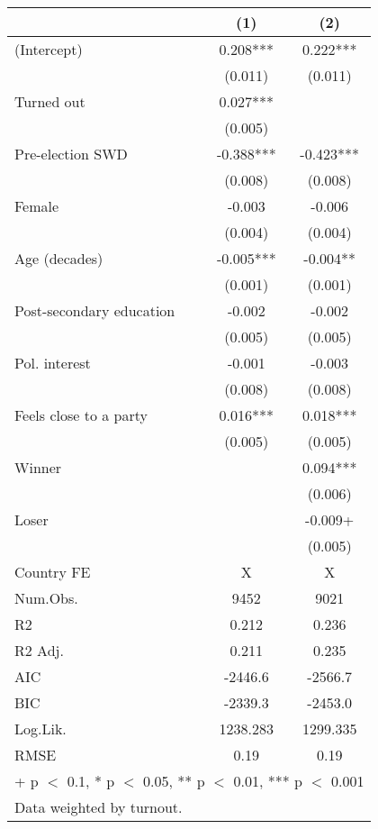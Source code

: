\begin{table}
\centering
\begin{tabular}[t]{lcc}
\toprule
  & (1) & (2)\\
\midrule
(Intercept) & 0.208*** & 0.222***\\
 & (0.011) & (0.011)\\
Turned out & 0.027*** & \\
 & (0.005) & \\
Pre-election SWD & -0.388*** & -0.423***\\
 & (0.008) & \vphantom{1} (0.008)\\
Female & -0.003 & -0.006\\
 & (0.004) & (0.004)\\
Age (decades) & -0.005*** & -0.004**\\
 & (0.001) & (0.001)\\
Post-secondary education & -0.002 & -0.002\\
 & (0.005) & \vphantom{1} (0.005)\\
Pol. interest & -0.001 & -0.003\\
 & (0.008) & (0.008)\\
Feels close to a party & 0.016*** & 0.018***\\
 & (0.005) & (0.005)\\
Winner &  & 0.094***\\
 &  & (0.006)\\
Loser &  & -0.009+\\
 &  & (0.005)\\
\midrule
Country FE & X & X\\
Num.Obs. & 9452 & 9021\\
R2 & 0.212 & 0.236\\
R2 Adj. & 0.211 & 0.235\\
AIC & -2446.6 & -2566.7\\
BIC & -2339.3 & -2453.0\\
Log.Lik. & 1238.283 & 1299.335\\
RMSE & 0.19 & 0.19\\
\bottomrule
\multicolumn{3}{l}{\rule{0pt}{1em}+ p $<$ 0.1, * p $<$ 0.05, ** p $<$ 0.01, *** p $<$ 0.001}\\
\multicolumn{3}{l}{\rule{0pt}{1em}Data weighted by turnout.}\\
\end{tabular}
\end{table}
